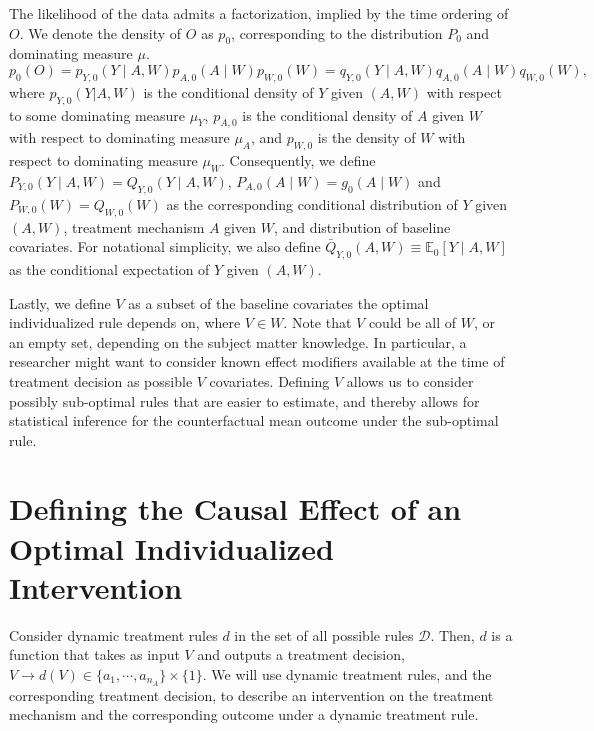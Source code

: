 \documentclass[12pt, krantz2,]{krantz}
\theoremstyle{definition}
\theoremstyle{definition}
\theoremstyle{definition}
\newcommand{\E}{\mathbb{E}}
\newcommand{\1}{\mathbbm{1}}
\begin{document}
The likelihood of the data admits a factorization, implied by the time ordering
of \(O\). We denote the density of \(O\) as \(p_0\), corresponding to the
distribution \(P_0\) and dominating measure \(\mu\).
\begin{equation}
  p_0(O) = p_{Y,0}(Y \mid A,W) p_{A,0}(A \mid W) p_{W,0}(W) =
    q_{Y,0}(Y \mid A,W) q_{A,0}(A \mid W) q_{W,0}(W),
  \label{eq:likelihood-factorization-mopttx}
\end{equation}
where \(p_{Y,0}(Y|A,W)\) is the conditional density of \(Y\) given \((A, W)\) with
respect to some dominating measure \(\mu_Y\), \(p_{A,0}\) is the conditional density
of \(A\) given \(W\) with respect to dominating measure \(\mu_A\), and \(p_{W,0}\) is
the density of \(W\) with respect to dominating measure \(\mu_W\). Consequently, we
define \(P_{Y,0}(Y \mid A, W) = Q_{Y,0}(Y \mid A,W)\), \(P_{A,0}(A \mid W) = g_0(A \mid W)\) and \(P_{W,0}(W)=Q_{W,0}(W)\) as the corresponding conditional
distribution of \(Y\) given \((A,W)\), treatment mechanism \(A\) given \(W\), and
distribution of baseline covariates. For notational simplicity, we also define
\(\bar{Q}_{Y,0}(A,W) \equiv \E_0[Y \mid A,W]\) as the conditional expectation of
\(Y\) given \((A,W)\).

Lastly, we define \(V\) as a subset of the baseline covariates the optimal
individualized rule depends on, where \(V \in W\). Note that \(V\) could be all of
\(W\), or an empty set, depending on the subject matter knowledge. In particular,
a researcher might want to consider known effect modifiers available at the time
of treatment decision as possible \(V\) covariates. Defining \(V\) allows us to
consider possibly sub-optimal rules that are easier to estimate, and thereby
allows for statistical inference for the counterfactual mean outcome under the
sub-optimal rule.

\hypertarget{defining-the-causal-effect-of-an-optimal-individualized-intervention}{%
\section{Defining the Causal Effect of an Optimal Individualized Intervention}\label{defining-the-causal-effect-of-an-optimal-individualized-intervention}}

Consider dynamic treatment rules \(d\) in the set of all possible rules
\(\mathcal{D}\). Then, \(d\) is a function that takes as input \(V\) and outputs a
treatment decision, \(V \rightarrow d(V) \in \{a_1, \cdots, a_{n_A} \} \times \{1\}\). We will use dynamic treatment rules, and the corresponding treatment
decision, to describe an intervention on the treatment mechanism and the
corresponding outcome under a dynamic treatment rule.
\end{document}
